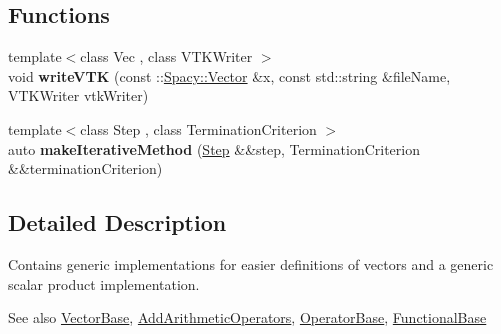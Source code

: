 \subsection*{Functions}
\begin{DoxyCompactItemize}
\item 
{\footnotesize template$<$class Vec , class V\+T\+K\+Writer $>$ }\\void {\bfseries write\+V\+TK} (const \+::\hyperlink{classSpacy_1_1Vector}{Spacy\+::\+Vector} \&x, const std\+::string \&file\+Name, V\+T\+K\+Writer vtk\+Writer)\hypertarget{namespaceSpacy_1_1Generic_a2507c0093c30bbad744a860e4cbe54d4}{}\label{namespaceSpacy_1_1Generic_a2507c0093c30bbad744a860e4cbe54d4}

\item 
{\footnotesize template$<$class Step , class Termination\+Criterion $>$ }\\auto {\bfseries make\+Iterative\+Method} (\hyperlink{classSpacy_1_1Generic_1_1Step}{Step} \&\&step, Termination\+Criterion \&\&termination\+Criterion)\hypertarget{namespaceSpacy_1_1Generic_a3088c967001284a5f281082fa19168b0}{}\label{namespaceSpacy_1_1Generic_a3088c967001284a5f281082fa19168b0}

\end{DoxyCompactItemize}


\subsection{Detailed Description}
Contains generic implementations for easier definitions of vectors and a generic scalar product implementation. 

\begin{DoxySeeAlso}{See also}
\hyperlink{classSpacy_1_1VectorBase}{Vector\+Base}, \hyperlink{classSpacy_1_1AddArithmeticOperators}{Add\+Arithmetic\+Operators}, \hyperlink{classSpacy_1_1OperatorBase}{Operator\+Base}, \hyperlink{classSpacy_1_1FunctionalBase}{Functional\+Base} 
\end{DoxySeeAlso}
